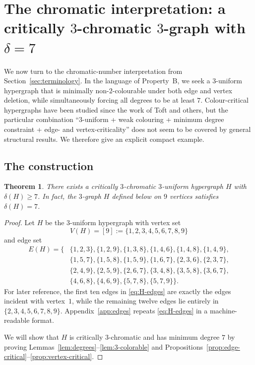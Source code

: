 \documentclass[11pt]{amsart}
\newtheorem{theorem}{Theorem}[section]
\theoremstyle{definition}
\theoremstyle{remark}
\newcommand{\V}{V}
\newcommand{\E}{E}
\newcommand{\del}{\delta}
\begin{document}
\section{The chromatic interpretation: a critically \texorpdfstring{$3$}{3}-chromatic \texorpdfstring{$3$}{3}-graph with \texorpdfstring{$\del=7$}{delta=7}}\label{sec:chromatic}

We now turn to the chromatic-number interpretation from Section~\ref{sec:terminology}.
In the language of Property~B, we seek a $3$-uniform hypergraph that is minimally non-$2$-colourable under both edge and vertex deletion, while simultaneously forcing all degrees to be at least $7$.
Colour-critical hypergraphs have been studied since the work of Toft and others,\cite{Toft1974,AbbottHare1999,KostochkaSurvey2006}
but the particular combination ``$3$-uniform + weak colouring + minimum degree constraint + edge- and vertex-criticality'' does not seem to be covered by general structural results.
We therefore give an explicit compact example.

\subsection{The construction}\label{subsec:construction}

\begin{theorem}\label{thm:construction}
There exists a critically $3$-chromatic $3$-uniform hypergraph $H$ with $\del(H)\ge 7$.
In fact, the $3$-graph $H$ defined below on $9$ vertices satisfies $\del(H)=7$.
\end{theorem}

\begin{proof}
Let $H$ be the $3$-uniform hypergraph with vertex set
\[
\V(H)=[9]:=\{1,2,3,4,5,6,7,8,9\}
\]
and edge set
\begin{equation}\label{eq:H-edges}
\begin{aligned}
\E(H)=\{&
\{1,2,3\},\{1,2,9\},\{1,3,8\},\{1,4,6\},\{1,4,8\},\{1,4,9\},\\
&
\{1,5,7\},\{1,5,8\},\{1,5,9\},\{1,6,7\},\{2,3,6\},\{2,3,7\},\\
&
\{2,4,9\},\{2,5,9\},\{2,6,7\},\{3,4,8\},\{3,5,8\},\{3,6,7\},\\
&
\{4,6,8\},\{4,6,9\},\{5,7,8\},\{5,7,9\}\}.
\end{aligned}
\end{equation}
For later reference, the first ten edges in \eqref{eq:H-edges} are exactly the edges incident with vertex~$1$, while the remaining twelve edges lie entirely in $\{2,3,4,5,6,7,8,9\}$.
Appendix~\ref{app:edges} repeats \eqref{eq:H-edges} in a machine-readable format.

We will show that $H$ is critically $3$-chromatic and has minimum degree $7$ by proving Lemmas~\ref{lem:degrees}--\ref{lem:3-colorable} and Propositions~\ref{prop:edge-critical}--\ref{prop:vertex-critical}.
\end{proof}
\end{document}
